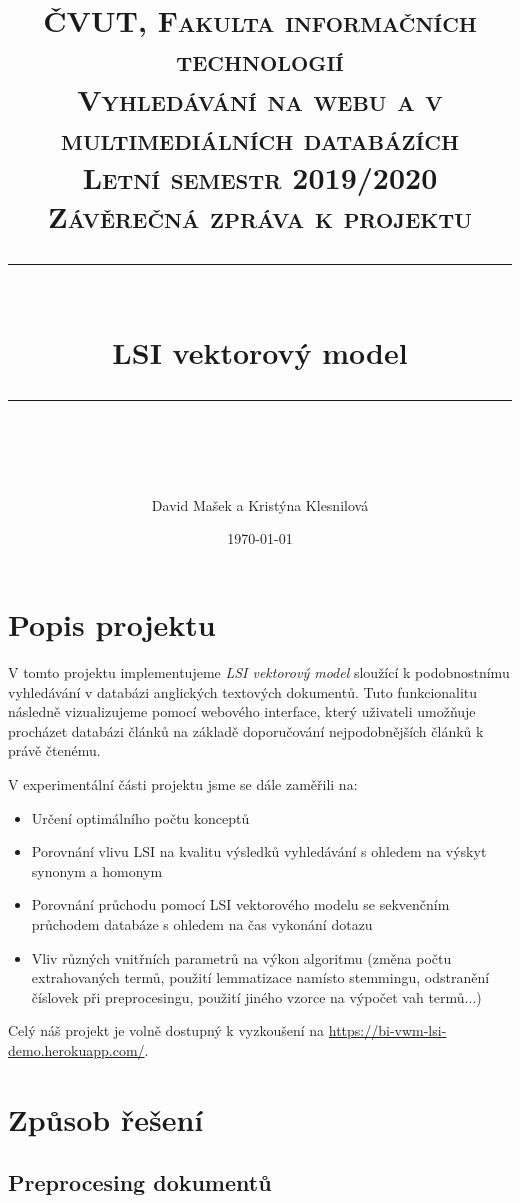 \documentclass[11pt]{scrartcl} %
\title{	
	\normalfont\normalsize
	\textsc{ČVUT, Fakulta informačních technologií}\\ %
	\textsc{Vyhledávání na webu a v multimediálních databázích}\\
	\textsc{Letní semestr 2019/2020}\\
	\textsc{Závěrečná zpráva k projektu}\\
	\vspace{25pt} %
	\rule{\linewidth}{0.5pt}\\ %
	\vspace{20pt} %
	{\huge LSI vektorový model}\\ %
	\vspace{12pt} %
	\rule{\linewidth}{2pt}\\ %
	\vspace{12pt} %
}
\author{\LARGE David Mašek a Kristýna Klesnilová} %
\date{\normalsize\today} %
\begin{document}
\maketitle %

\newpage

\tableofcontents

\newpage

\section{Popis projektu}

V tomto projektu implementujeme \emph{LSI vektorový model} sloužící k podobnostnímu vyhledávání v databázi anglických textových dokumentů. Tuto funkcionalitu následně vizualizujeme pomocí webového interface, který uživateli umožňuje procházet databázi článků na základě doporučování nejpodobnějších článků k právě čtenému.

\bigskip 

V experimentální části projektu jsme se dále zaměřili na:
\begin{itemize}
	\item Určení optimálního počtu konceptů
	\item Porovnání vlivu LSI na kvalitu výsledků vyhledávání s ohledem na výskyt synonym a homonym
	\item Porovnání průchodu pomocí LSI vektorového modelu se sekvenčním průchodem databáze s ohledem na čas vykonání dotazu
	\item Vliv různých vnitřních parametrů na výkon algoritmu (změna počtu extrahovaných termů, použití lemmatizace namísto stemmingu, odstranění číslovek při preprocesingu, použití jiného vzorce na výpočet vah termů...)
\end{itemize}

\bigskip 

Celý náš projekt je volně dostupný k vyzkoušení na \url{https://bi-vwm-lsi-demo.herokuapp.com/}.

\section{Způsob řešení}

\subsection{Preprocesing dokumentů}
\end{document}
